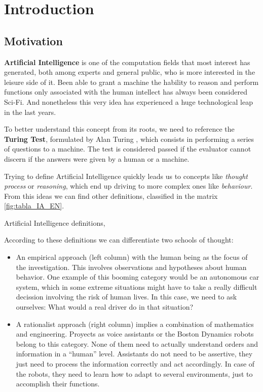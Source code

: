 \chapter{Introduction}



\section{Motivation}

\textbf{Artificial Intelligence} is one of the computation fields that most interest has generated, both among experts and general public, who is more interested in the leisure side of it. Been able to grant a machine the hability to reason and perform functions only associated with the human intellect has always been considered Sci-Fi. And nonetheless this very idea has experienced a huge technological leap in the last years.

To better understand this concept from its roots, we need to reference the \textbf{Turing Test}, formulated by Alan Turing \citep{Turing1950-TURCMA}, which consists in performing a series of questions to a machine. The test is considered passed if the evaluator cannot discern if the answers were given by a human or a machine.

Trying to define Artificial Intelligence quickly leads us to concepts like \textit{thought process} or \textit{reasoning}, which end up driving to more complex ones like \textit{behaviour}. From this ideas we can find other definitions, classified in the matrix \ref{fig:tabla_IA_EN}.

%
       {Artificial Intelligence definitions, \citet{Russell:2009:AIM:1671238}}

According to these definitions we can differentiate two schools of thought:
\begin{itemize}
    \item An empirical approach (left column) with the human being as the focus of the investigation. This involves observations and hypotheses about human behavior. One example of this booming category would be an autonomous car system, which in some extreme situations might have to take a really difficult decission involving the risk of human lives. In this case, we need to ask ourselves: What would a real driver do in that situation?
    \item A rationalist approach (right column) implies a combination of mathematics and engineering. Proyects as voice assistants or the Boston Dynamics robots belong to this category. None of them need to actually understand orders and information in a ``human'' level. Assistants do not need to be assertive, they just need to process the information correctly and act accordingly. In case of the robots, they need to learn how to adapt to several environments, just to accomplish their functions.
\end{itemize}

